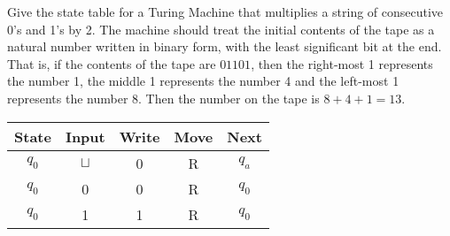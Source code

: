 \documentclass[a4paper, 12pt]{exam}
\begin{document}
\begin{questions}
\question
  Give the state table for a Turing Machine that multiplies a string of consecutive 0's and 1's by 2.
  The machine should treat the initial contents of the tape as a natural number written in binary form, with the least significant bit at the end.
  That is, if the contents of the tape are $01101$, then the right-most 1 represents the number 1, the middle 1 represents the number 4 and the left-most 1 represents the number 8.
  Then the number on the tape is $8+4+1=13$.
  \begin{solution}
    \begin{table}[H]
      \centering
      \begin{tabular}{ccccc}
        \toprule
            State & Input & Write & Move & Next \\
        \midrule
            $q_0$ & $\sqcup$ & 0 & R & $q_a$ \\
            $q_0$ & 0 & 0 & R & $q_0$ \\
            $q_0$ & 1 & 1 & R & $q_0$ \\
        \bottomrule
        \hline
      \end{tabular}
    \end{table}
  \end{solution}



\end{questions}
\end{document}
